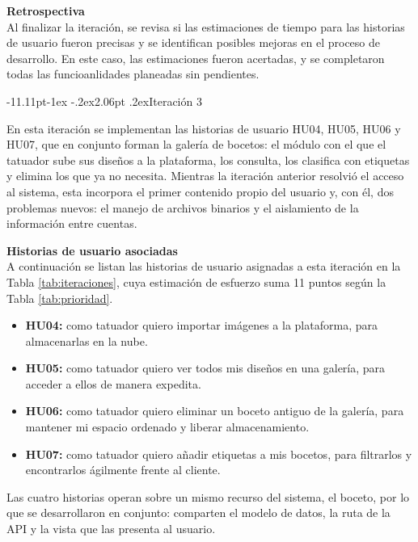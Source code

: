 \documentclass[12pt,letterpaper,oneside]{report}
\makeatletter
\renewcommand\subsection{\@startsection{subsection}{2}{\z@}%
  {-11.11pt\@plus -1ex \@minus -.2ex}{2.06pt \@plus .2ex}{\normalfont\normalsize\bfseries}}
\newcommand{\tituloparpegado}[1]{\par\textbf{#1}\\\indent\ignorespaces}
\makeatother
\begin{document}
\vspace{\parskip}
\tituloparpegado{Retrospectiva}
Al finalizar la iteración, se revisa si las estimaciones de tiempo para las historias de usuario fueron precisas y se identifican posibles mejoras en el proceso de desarrollo. En este caso, las estimaciones fueron acertadas, y se completaron todas las funcioanlidades planeadas sin pendientes.

\subsection{Iteración 3}

En esta iteración se implementan las historias de usuario HU04, HU05, HU06 y HU07, que en conjunto forman la galería de bocetos: el módulo con el que el tatuador sube sus diseños a la plataforma, los consulta, los clasifica con etiquetas y elimina los que ya no necesita. Mientras la iteración anterior resolvió el acceso al sistema, esta incorpora el primer contenido propio del usuario y, con él, dos problemas nuevos: el manejo de archivos binarios y el aislamiento de la información entre cuentas.

\vspace{0.3cm}
\tituloparpegado{Historias de usuario asociadas}
A continuación se listan las historias de usuario asignadas a esta iteración en la Tabla \ref{tab:iteraciones}, cuya estimación de esfuerzo suma 11 puntos según la Tabla \ref{tab:prioridad}.

\begin{itemize}
  \item \textbf{HU04:} como tatuador quiero importar imágenes a la plataforma, para almacenarlas en la nube.
  \item \textbf{HU05:} como tatuador quiero ver todos mis diseños en una galería, para acceder a ellos de manera expedita.
  \item \textbf{HU06:} como tatuador quiero eliminar un boceto antiguo de la galería, para mantener mi espacio ordenado y liberar almacenamiento.
  \item \textbf{HU07:} como tatuador quiero añadir etiquetas a mis bocetos, para filtrarlos y encontrarlos ágilmente frente al cliente.
\end{itemize}

Las cuatro historias operan sobre un mismo recurso del sistema, el boceto, por lo que se desarrollaron en conjunto: comparten el modelo de datos, la ruta de la API y la vista que las presenta al usuario.
\end{document}
